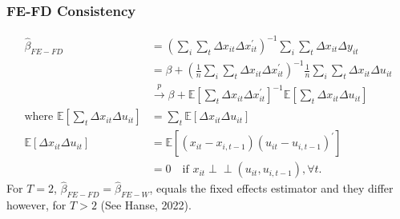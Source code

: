 \subsubsection{FE-FD Consistency}
\begin{align*}
    \hat{\beta}_{FE-FD} &= \left(\sum_i \sum_t \Delta x_{it} \Delta x_{it}^{\prime} \right)^{-1} \sum_i \sum_t \Delta x_{it} \Delta y_{it} \\
    &= \beta + \left(\frac{1}{n} \sum_i \sum_t \Delta x_{it} \Delta x_{it}^{\prime} \right)^{-1} \frac{1}{n} \sum_i \sum_t \Delta x_{it} \Delta u_{it} \\
    &\overset{p}{\rightarrow} \beta + \mathbb{E}\left[\sum_t \Delta x_{it} \Delta x_{it}^{\prime} \right]^{-1} \mathbb{E}\left[\sum_t \Delta x_{it} \Delta u_{it} \right] \\
    \text{where } \mathbb{E}\left[\sum_t \Delta x_{it} \Delta u_{it}\right] &= \sum_t \mathbb{E}\left[\Delta x_{it} \Delta u_{it} \right]\\
    \mathbb{E}\left[\Delta x_{it} \Delta u_{it} \right] &= \mathbb{E}\left[\left(x_{it} - x_{i, t-1} \right) \left(u_{it} - u_{i, t-1} \right)^{\prime} \right] \\
    &= 0 \quad \text{if } x_{it} \perp\!\!\!\perp (u_{it}, u_{i, t-1}), \forall t.
\end{align*}
For $T = 2$, $\hat{\beta}_{FE-FD} = \hat{\beta}_{FE-W}$, equals the fixed effects estimator and they differ however, for $T>2$ (See Hanse, 2022\cite{hansen2022econometrics}).

